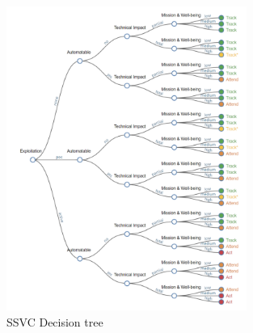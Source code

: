 \begin{figure}
    \centering
    \includegraphics[width=0.7\textwidth]{images/cisa_ssvc_tree.png}
    \caption{SSVC Decision tree}
    \label{fig:cisa_ssvc_tree}
\end{figure}
